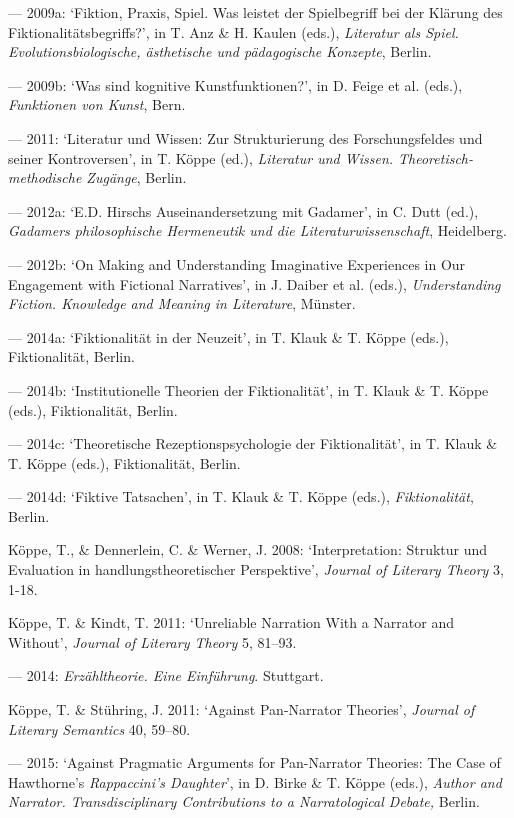 \begin{hangparas}{.5cm}{1}
--- 2009a: `Fiktion, Praxis, Spiel. Was leistet der Spielbegriff bei der Kl\"arung des Fiktionalit\"atsbegriffs?', in T. Anz \& H. Kaulen (eds.), \emph{Literatur als Spiel.  Evolutionsbiologische, \"asthetische und p\"adagogische Konzepte}, Berlin.

--- 2009b: `Was sind kognitive Kunstfunktionen?', in D. Feige et al. (eds.), \emph{Funktionen von Kunst}, Bern.

--- 2011: `Literatur und Wissen: Zur Strukturierung des Forschungsfeldes und seiner Kontroversen', in T. K\"oppe (ed.), \emph{Literatur und Wissen. Theoretisch-methodische Zug\"ange}, Berlin.

--- 2012a: `E.D. Hirschs Auseinandersetzung mit Gadamer', in C. Dutt (ed.), \emph{Gadamers philosophische Hermeneutik und die Literaturwissenschaft}, Heidelberg.

--- 2012b: `On Making and Understanding Imaginative Experiences in Our Engagement with Fictional Narratives', in J. Daiber et al. (eds.), \emph{Understanding Fiction. Knowledge and Meaning in Literature}, M\"unster.

--- 2014a: `Fiktionalit\"at in der Neuzeit', in T. Klauk \& T. K\"oppe (eds.), Fiktionalit\"at, Berlin.

--- 2014b: `Institutionelle Theorien der Fiktionalit\"at', in T. Klauk \& T. K\"oppe (eds.), Fiktionalit\"at, Berlin. 

--- 2014c: `Theoretische Rezeptionspsychologie der Fiktionalit\"at', in T. Klauk \& T. K\"oppe (eds.), Fiktionalit\"at, Berlin.

--- 2014d: `Fiktive Tatsachen', in T. Klauk \& T. K\"oppe (eds.), \emph{Fiktionalit\"at}, Berlin.

K\"oppe, T., \& Dennerlein, C. \& Werner, J. 2008: `Interpretation: Struktur und Evaluation in handlungstheoretischer Perspektive', \emph{Journal of Literary Theory} 3, 1-18.

K\"oppe, T. \& Kindt, T. 2011: `Unreliable Narration With a Narrator and Without', \emph{Journal of Literary Theory} 5, 81--93.

--- 2014: \emph{Erz\"ahltheorie. Eine Einf\"uhrung}. Stuttgart.

K\"oppe, T. \& St\"uhring, J. 2011: `Against Pan-Narrator Theories', \emph{Journal of Literary Semantics} 40, 59--80.

--- 2015: `Against Pragmatic Arguments for Pan-Narrator Theories: The Case of Hawthorne's \emph{Rappaccini's Daughter}', in D. Birke \& T. K\"oppe (eds.), \emph{Author and Narrator. Transdisciplinary Contributions to a Narratological Debate,} Berlin.


\end{hangparas}
